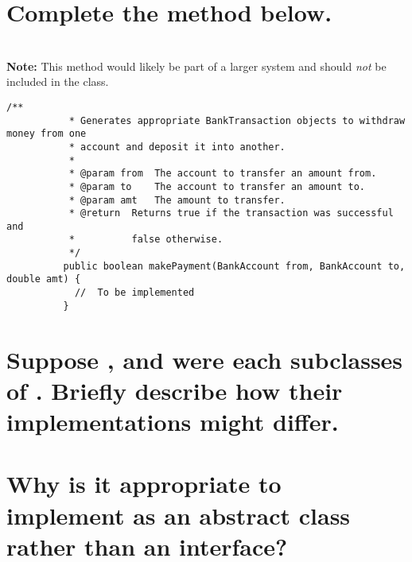 \begin{questions}
\begin{parts}
        \part{Complete the  method below.}\\
        {\small\textbf{Note:} This method would likely be part of a larger system and should \emph{not} be included in the  class.}

        \begin{lstlisting}[basicstyle=\ttfamily\small,tabsize=2]
          /**
           * Generates appropriate BankTransaction objects to withdraw money from one 
           * account and deposit it into another.
           * 
           * @param from  The account to transfer an amount from.
           * @param to    The account to transfer an amount to.
           * @param amt   The amount to transfer.
           * @return  Returns true if the transaction was successful and 
           *          false otherwise.
           */
          public boolean makePayment(BankAccount from, BankAccount to, double amt) {
            //  To be implemented
          }
        \end{lstlisting}
        \part{Suppose ,  and  were each subclasses of . Briefly describe how their  implementations might differ.}
        \part{Why is it appropriate to implement  as an abstract class rather than an interface?}
      \end{parts}
  \end{questions}

